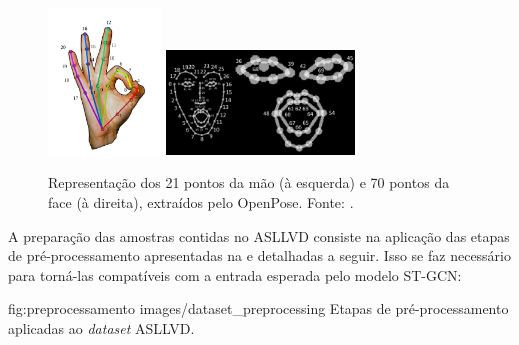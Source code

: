 \begin{figure}[ht]
    \centering
    \includegraphics[width=3cm]{images/keypoints_hand}
    \includegraphics[width=5cm]{images/keypoints_face}
    \caption{Representação dos 21 pontos da mão (à esquerda) e 70 pontos da face (à direita), extraídos pelo OpenPose. Fonte: \cite{openpose-output-2018}.}
    \label{fig:keypoints-face-hand}
\end{figure}


A preparação das amostras contidas no ASLLVD consiste na aplicação das etapas de pré-processamento apresentadas na  e detalhadas a seguir. Isso se faz necessário para torná-las compatíveis com a entrada esperada pelo modelo ST-GCN:


\image
    {fig:preprocessamento}
    {images/dataset_preprocessing}
    {Etapas de pré-processamento aplicadas ao \textit{dataset} ASLLVD.}

